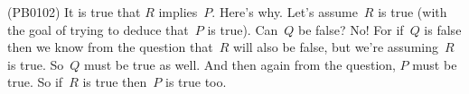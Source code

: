 (PB0102) It is true that $R$ implies~$P$. Here's why. Let's assume~$R$ is true (with the goal of trying to deduce that~$P$ is true). Can~$Q$ be false? No! For if~$Q$ is false then we know from the question that~$R$ will also be false, but we're assuming~$R$ is true. So~$Q$ must be true as well. And then again from the question, $P$ must be true. So if~$R$ is true then~$P$ is true too.
